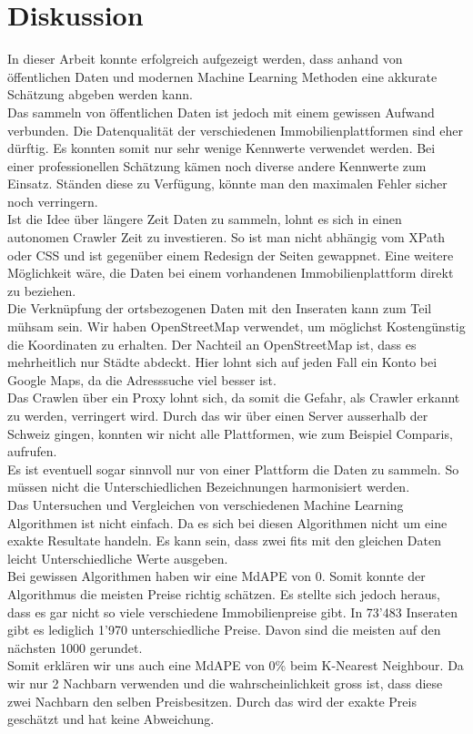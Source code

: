 \section{Diskussion}
In dieser Arbeit konnte erfolgreich aufgezeigt werden, dass anhand von öffentlichen Daten und modernen Machine Learning Methoden eine akkurate Schätzung abgeben werden kann.\\[2ex]
%
Das sammeln von öffentlichen Daten ist jedoch mit einem gewissen Aufwand verbunden. Die Datenqualität der verschiedenen Immobilienplattformen sind eher dürftig. Es konnten somit nur sehr wenige Kennwerte verwendet werden. Bei einer professionellen Schätzung kämen noch diverse andere Kennwerte zum Einsatz. Ständen diese zu Verfügung, könnte man den maximalen Fehler sicher noch verringern.\\
Ist die Idee über längere Zeit Daten zu sammeln, lohnt es sich in einen autonomen Crawler Zeit zu investieren. So ist man nicht abhängig vom XPath oder CSS und ist gegenüber einem Redesign der Seiten gewappnet. Eine weitere Möglichkeit wäre, die Daten bei einem vorhandenen Immobilienplattform direkt zu beziehen.\\
Die Verknüpfung der ortsbezogenen Daten mit den Inseraten kann zum Teil mühsam sein. Wir haben OpenStreetMap verwendet, um möglichst Kostengünstig die Koordinaten zu erhalten. Der Nachteil an OpenStreetMap ist, dass es mehrheitlich nur Städte abdeckt. Hier lohnt sich auf jeden Fall ein Konto bei Google Maps, da die Adresssuche viel besser ist.\\[2ex]
%
Das Crawlen über ein Proxy lohnt sich, da somit die Gefahr, als Crawler erkannt zu werden, verringert wird. Durch das wir über einen Server ausserhalb der Schweiz gingen, konnten wir nicht alle Plattformen, wie zum Beispiel Comparis, aufrufen.\\
Es ist eventuell sogar sinnvoll nur von einer Plattform die Daten zu sammeln. So müssen nicht die Unterschiedlichen Bezeichnungen harmonisiert werden.\\[2ex]
%
Das Untersuchen und Vergleichen von verschiedenen Machine Learning Algorithmen ist nicht einfach. Da es sich bei diesen Algorithmen nicht um eine exakte Resultate handeln. Es kann sein, dass zwei fits mit den gleichen Daten leicht Unterschiedliche Werte ausgeben.\\
Bei gewissen Algorithmen haben wir eine MdAPE von 0. Somit konnte der Algorithmus die meisten Preise richtig schätzen. Es stellte sich jedoch heraus, dass es gar nicht so viele verschiedene Immobilienpreise gibt. In 73'483 Inseraten gibt es lediglich 1'970 unterschiedliche Preise. Davon sind die meisten auf den nächsten 1000 gerundet.\\
Somit erklären wir uns auch eine MdAPE von 0\% beim K-Nearest Neighbour. Da wir nur 2 Nachbarn verwenden und die wahrscheinlichkeit gross ist, dass diese zwei Nachbarn den selben Preisbesitzen. Durch das wird der exakte Preis geschätzt und hat keine Abweichung.


